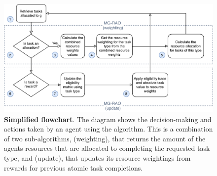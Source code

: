\begin{figure}[ht]
	\centering
	\includegraphics[width=0.8\linewidth, trim={55pt 0pt 55pt 0pt, clip}]{mgrao-simplified}
	\caption{\textbf{Simplified \acronymMGRAO{}{} flowchart}. The diagram shows the decision-making and actions taken by an agent using the \acronymMGRAO{}{}  algorithm. This is a combination of two sub-algorithms, \acronymMGRAO{}{}(weighting), that returns the amount of the agents resources that are allocated to completing the requested task type, and  \acronymMGRAO{}{}(update), that updates its resource weightings from rewards for previous atomic task completions.}
	\label{fig:mgrao-simplified}
\end{figure}
